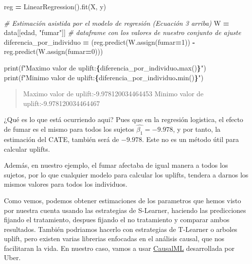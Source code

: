 \documentclass[
  a4paper,
  DIV=11,
  numbers=noendperiod]{scrreprt}
\newenvironment{Shaded}{\begin{snugshade}}{\end{snugshade}}
\newcommand{\BuiltInTok}[1]{#1}
\newcommand{\CommentTok}[1]{\textcolor[rgb]{0.56,0.35,0.01}{\textit{#1}}}
\newcommand{\DecValTok}[1]{\textcolor[rgb]{0.00,0.00,0.81}{#1}}
\newcommand{\NormalTok}[1]{#1}
\newcommand{\OperatorTok}[1]{\textcolor[rgb]{0.81,0.36,0.00}{\textbf{#1}}}
\newcommand{\SpecialCharTok}[1]{\textcolor[rgb]{0.81,0.36,0.00}{\textbf{#1}}}
\newcommand{\SpecialStringTok}[1]{\textcolor[rgb]{0.31,0.60,0.02}{#1}}
\newcommand{\StringTok}[1]{\textcolor[rgb]{0.31,0.60,0.02}{#1}}
\begin{document}
\begin{Shaded}
\begin{Highlighting}[numbers=left,,]
\NormalTok{reg }\OperatorTok{=}\NormalTok{ LinearRegression().fit(X, y)}

\CommentTok{\# Estimación asistida por el modelo de regresión (Ecuación 3 arriba)}
\NormalTok{W }\OperatorTok{=}\NormalTok{ data[[}\StringTok{\textquotesingle{}edad\textquotesingle{}}\NormalTok{, }\StringTok{"fumar"}\NormalTok{]] }\CommentTok{\# dataframe con los valores de nuestro conjunto de ajuste}
\NormalTok{diferencia\_por\_individuo }\OperatorTok{=}\NormalTok{ (reg.predict(W.assign(fumar}\OperatorTok{=}\DecValTok{1}\NormalTok{))}
                           \OperatorTok{{-}}\NormalTok{ reg.predict(W.assign(fumar}\OperatorTok{=}\DecValTok{0}\NormalTok{)))}

\BuiltInTok{print}\NormalTok{(}\SpecialStringTok{f"Maximo valor de uplift:}\SpecialCharTok{\{}\NormalTok{diferencia\_por\_individuo}\SpecialCharTok{.}\BuiltInTok{max}\NormalTok{()}\SpecialCharTok{\}}\SpecialStringTok{"}\NormalTok{)}
\BuiltInTok{print}\NormalTok{(}\SpecialStringTok{f"Minimo valor de uplift:}\SpecialCharTok{\{}\NormalTok{diferencia\_por\_individuo}\SpecialCharTok{.}\BuiltInTok{min}\NormalTok{()}\SpecialCharTok{\}}\SpecialStringTok{"}\NormalTok{)}
\end{Highlighting}
\end{Shaded}

\begin{quote}
Maximo valor de uplift:-9.978120034464453 Minimo valor de
uplift:-9.978120034464467
\end{quote}

¿Qué es lo que está ocurriendo aqui? Pues que en la regresión logistica,
el efecto de fumar es el mismo para todos los sujetos
\(\hat{\beta_1} = -9.978\), y por tanto, la estimación del CATE, también
será de \(-9.978\). Este no es un método útil para calcular uplifts.

Además, en nuestro ejemplo, el fumar afectaba de igual manera a todos
los sujetos, por lo que cualquier modelo para calcular los uplifts,
tendera a darnos los mismos valores para todos los individuos.

Como vemos, podemos obtener estimaciones de los parametros que hemos
visto por nuestra cuenta usando las estrategias de S-Learner, haciendo
las predicciones fijando el tratamiento, despues fijando el no
tratamiento y comparar ambos resultados. También podriamos hacerlo con
estrategias de T-Learner o arboles uplift, pero existen varias librerias
enfocadas en el análisis causal, que nos facilitaran la vida. En nuestro
caso, vamos a usar \href{https://github.com/uber/causalml}{CausalML}
desarrollada por Uber.
\end{document}
